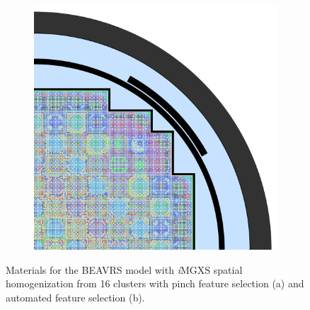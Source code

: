 \begin{figure}[h!]
\begin{subfigure}{0.68\textwidth}
  \includegraphics[width=\linewidth]{figures/unsupervised/geometries/with-features/16-clusters/combined/full-core}
  \caption{}
  \label{fig:chap10-full-core-combined-16}
\end{subfigure}
\caption[Materials for BEAVRS with clustering homogenization (16 clusters)]{Materials for the \ac{BEAVRS} model with \textit{i}\ac{MGXS} spatial homogenization from 16 clusters with pinch feature selection (a) and automated feature selection (b).}
\label{fig:chap10-full-core-geometries-16}
\end{figure}

\clearpage

